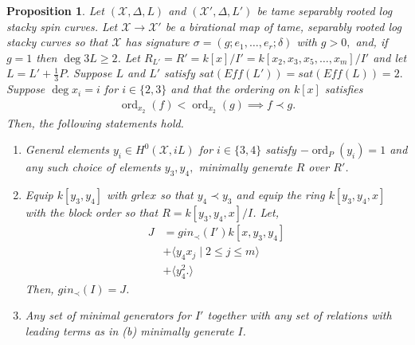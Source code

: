 \documentclass{amsart}
\theoremstyle{plain}
\newtheorem{prop}[thm]{Proposition}
\theoremstyle{definition}
\theoremstyle{remark}
\numberwithin{equation}{section}
\newcommand \sx{\mathscr X}
\DeclareMathOperator{\ord}{ord}
\begin{document}
\begin{prop}
\label{prop:sat_two_induction}
Let $(\sx, \Delta, L)$ and $(\sx', \Delta, L')$ be tame separably rooted log stacky spin curves. 
Let $\sx \rightarrow \sx'$ be a birational map of tame, separably rooted log stacky curves so that $\sx$ has signature 
$\sigma = (g;e_1,\ldots, e_r;\delta)$ with $g > 0,$ and, if $g = 1$ then $\deg 3L \geq 2$.
Let $R_{L'} = R' = k[x]/I'= k[x_2, x_3
, x_5,\ldots, x_m]/I'$ and let $L = L' + \frac{1}{
3}P.$ Suppose $L$ and $L'$ satisfy $sat(Eff(L')) = sat(Eff(L)) = 2.$
Suppose $\deg x_i = i$ for $i \in \{2, 3\}$ and that the ordering on $k[x]$ satisfies
\begin{align*}
	\ord_{x_2}(f) < \ord_{x_2}(g) \implies f \prec g.
\end{align*}
Then, the following statements hold.
\begin{enumerate}
	\item[(a)] General elements  $y_i \in H^0(\sx,iL)$ for $i \in \{3, 4\}$ satisfy $-\ord_P(y_i) = 1$ and any such choice of elements $y
		_3,y_4,$ minimally generate $R$ over $R'$.
	\item[(b)] Equip $k[y_3, y_4]$ with $grlex$ so that $y_4 \prec 
		y_3$
		and equip the ring $k[y_3, y_4, x]$ with the block 
		order so that $R = k[y_3, y_4, x]/I$. Let,
		\begin{align*}
			J &= gin_\prec(I')k[x, y_3, y_4] \\
			&+\langle y_4 x_j \mid 2 \leq j \leq m \rangle \\
			&+\langle y_4^2.\rangle
		\end{align*}
			Then, $gin_\prec(I) = J$.
	\item[(c)] Any set of minimal generators for $I'$ together with 
		any set of relations with leading terms as in (b) minimally 
		generate $I$.
\end{enumerate}
\end{prop}
\end{document}
